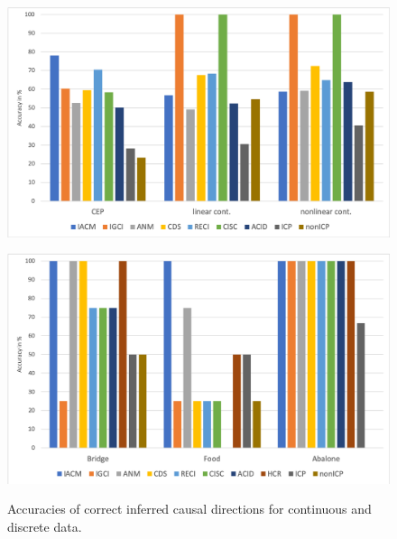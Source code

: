 \documentclass[letterpaper]{article}
\begin{document}
\begin{figure}[htb]
\begin{minipage}{\linewidth}
      \begin{minipage}{0.48\linewidth}
	      \centering
		  \includegraphics[scale=0.3]{results_cont_data.png}
           \label{fig.real_world_resultsa}
      \end{minipage}
      \hfill
      \begin{minipage}{0.48\linewidth}
	      \centering
  		  \includegraphics[scale=0.3]{result_real_discrete.png}
            \label{fig.real_world_resultsb}
      \end{minipage}
       \caption{Accuracies of correct inferred causal directions for continuous and discrete data.}
  \end{minipage}
\end{figure}
\end{document}

